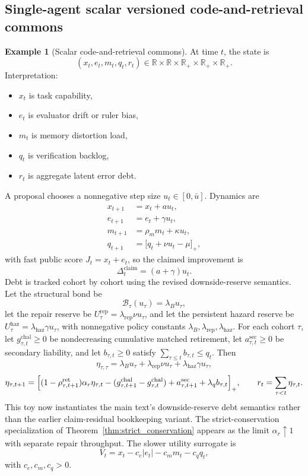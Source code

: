 \documentclass[11pt]{article}
\theoremstyle{definition}
\newtheorem{example}[theorem]{Example}
\newcommand{\R}{\mathbb{R}}
\newcommand{\1}{\mathbf{1}}
\newcommand{\abs}[1]{\left\lvert #1 \right\rvert}
\begin{document}
\subsection{Single-agent scalar versioned code-and-retrieval commons}
\begin{example}[Scalar code-and-retrieval commons]\label{ex:toy_single}
At time $t$, the state is
\[
(x_t,e_t,m_t,q_t,r_t)\in\R\times\R\times\R_+\times\R_+\times\R_+.
\]
Interpretation:
\begin{itemize}[leftmargin=1.8em]
  \item $x_t$ is task capability,
  \item $e_t$ is evaluator drift or ruler bias,
  \item $m_t$ is memory distortion load,
  \item $q_t$ is verification backlog,
  \item $r_t$ is aggregate latent error debt.
\end{itemize}
A proposal chooses a nonnegative step size $u_t\in[0,\bar u]$. Dynamics are
\begin{align}
  x_{t+1} &= x_t + a u_t, \\
  e_{t+1} &= e_t + \gamma u_t, \\
  m_{t+1} &= \rho_m m_t + \kappa u_t, \\
  q_{t+1} &= \bigl[q_t + \nu u_t - \mu\bigr]_+, 
\end{align}
with fast public score $J_t=x_t+e_t$, so the claimed improvement is
\[
\Delta_t^{\mathrm{claim}}=(a+\gamma)u_t.
\]
Debt is tracked cohort by cohort using the revised downside-reserve semantics. Let the structural bond be
\[
\mathcal B_\tau(u_\tau)=\lambda_B u_\tau,
\]
let the repair reserve be $U_\tau^{\mathrm{rep}}=\lambda_{\mathrm{rep}}\nu u_\tau$, and let the persistent hazard reserve be $U_\tau^{\mathrm{haz}}=\lambda_{\mathrm{haz}}\gamma u_\tau$, with nonnegative policy constants $\lambda_B,\lambda_{\mathrm{rep}},\lambda_{\mathrm{haz}}$. For each cohort $\tau$, let $g_{\tau,t}^{\mathrm{chal}}\ge 0$ be nondecreasing cumulative matched retirement, let $a_{\tau,t}^{\mathrm{sec}}\ge 0$ be secondary liability, and let $b_{\tau,t}\ge 0$ satisfy $\sum_{\tau\le t}b_{\tau,t}\le q_t$. Then
\[
\eta_{\tau,\tau}=\lambda_B u_\tau+\lambda_{\mathrm{rep}}\nu u_\tau+\lambda_{\mathrm{haz}}\gamma u_\tau,
\]
\[
\eta_{\tau,t+1}=\Bigl[(1-\rho_{\tau,t+1}^{\mathrm{ret}})\alpha_r\eta_{\tau,t}-(g_{\tau,t+1}^{\mathrm{chal}}-g_{\tau,t}^{\mathrm{chal}})+a_{\tau,t+1}^{\mathrm{sec}}+\lambda_q b_{\tau,t}\Bigr]_+,
\qquad
r_t=\sum_{\tau<t}\eta_{\tau,t}.
\]
This toy now instantiates the main text's downside-reserve debt semantics rather than the earlier claim-residual bookkeeping variant. The strict-conservation specialization of Theorem~\ref{thm:strict_conservation} appears as the limit $\alpha_r\uparrow 1$ with separate repair throughput.
The slower utility surrogate is
\[
V_t = x_t - c_e\abs{e_t} - c_m m_t - c_q q_t,
\]
with $c_e,c_m,c_q>0$.
\end{example}
\end{document}
